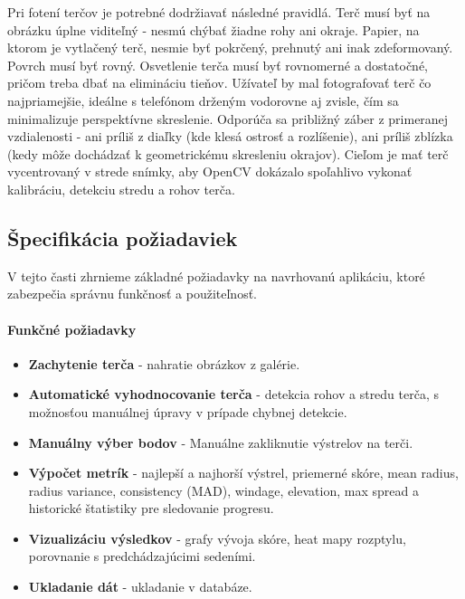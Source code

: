 Pri fotení terčov je potrebné dodržiavať následné pravidlá. Terč musí byť na obrázku úplne viditeľný - nesmú chýbať žiadne rohy ani okraje. Papier, na ktorom 
je vytlačený terč, nesmie byť pokrčený, prehnutý ani inak zdeformovaný. Povrch musí byť rovný. Osvetlenie terča musí byť rovnomerné a dostatočné, pričom treba dbať 
na elimináciu tieňov. Užívateľ by mal fotografovať terč čo najpriamejšie, ideálne s telefónom drženým vodorovne aj zvisle, čím sa minimalizuje perspektívne skreslenie. 
Odporúča sa približný záber z primeranej vzdialenosti - ani príliš z diaľky (kde klesá ostrosť a rozlíšenie), ani príliš zblízka (kedy môže dochádzať k geometrickému 
skresleniu okrajov). Cieľom je mať terč vycentrovaný v strede snímky, aby OpenCV dokázalo spoľahlivo vykonať kalibráciu, detekciu stredu a rohov terča.



\subsection{Špecifikácia požiadaviek}
V tejto časti zhrnieme základné požiadavky na navrhovanú aplikáciu, ktoré zabezpečia správnu funkčnosť a použiteľnosť.

\paragraph{Funkčné požiadavky}
\begin{itemize}
  \item \textbf{Zachytenie terča} - nahratie obrázkov z galérie.
  \item \textbf{Automatické vyhodnocovanie terča} - detekcia rohov a stredu terča, s možnosťou manuálnej úpravy v prípade chybnej detekcie.
  \item \textbf{Manuálny výber bodov} - Manuálne zakliknutie výstrelov na terči.
  \item \textbf{Výpočet metrík} - najlepší a najhorší výstrel, priemerné skóre, mean radius, radius variance, consistency (MAD), windage, elevation, max spread a historické štatistiky pre sledovanie progresu.
  \item \textbf{Vizualizáciu výsledkov} - grafy vývoja skóre, heat mapy rozptylu, porovnanie s predchádzajúcimi sedeními.
  \item \textbf{Ukladanie dát} - ukladanie v databáze.
\end{itemize}

